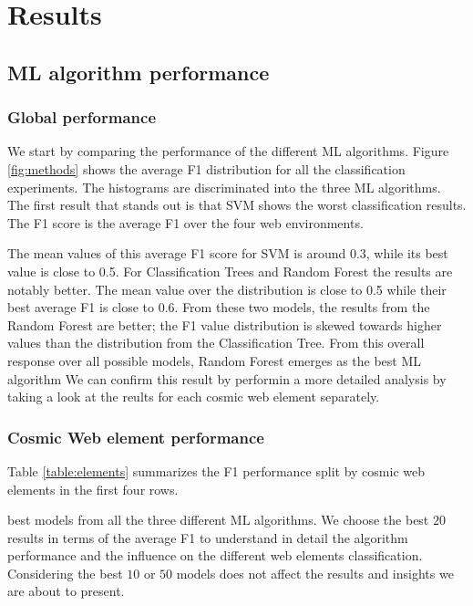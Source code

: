\documentclass[usenatbib]{mnras}
\begin{document}
\section{Results}\label{sec:results}


\subsection{ML algorithm performance}


\subsubsection{Global performance}
We start by comparing the performance of the different ML algorithms.
Figure \ref{fig:methods} shows the average F1 distribution for
all the classification experiments. 
The histograms are discriminated into the three ML algorithms.
The first result that stands out is that SVM shows the worst
classification results.
The F1 score is the average F1 over the four web environments.

The mean values of this average F1 score for SVM is around 0.3, while its best
value is close to 0.5.
For Classification Trees and Random Forest the results are notably better. 
The mean value over the distribution is close to 0.5 while their best
average F1 is close to 0.6.
From these two models, the results from the Random Forest are
better; the F1 value distribution is skewed towards higher values than
the distribution from the Classification Tree.
From this overall response over all possible models, Random Forest
emerges as the best ML algorithm
We can confirm this result by performin a more detailed analysis by
taking a look at the reults for each cosmic web element separately.



\subsubsection{Cosmic Web element performance}

Table \ref{table:elements} summarizes the F1 performance split by cosmic
web elements in the first four rows.


best models from all the three different ML algorithms.
We choose the best $20$ results in terms of the average F1 to understand
in detail the algorithm performance and the influence on the 
different web elements classification.
Considering the best $10$ or $50$ models does not affect the results
and insights we are about to present.
\end{document}
